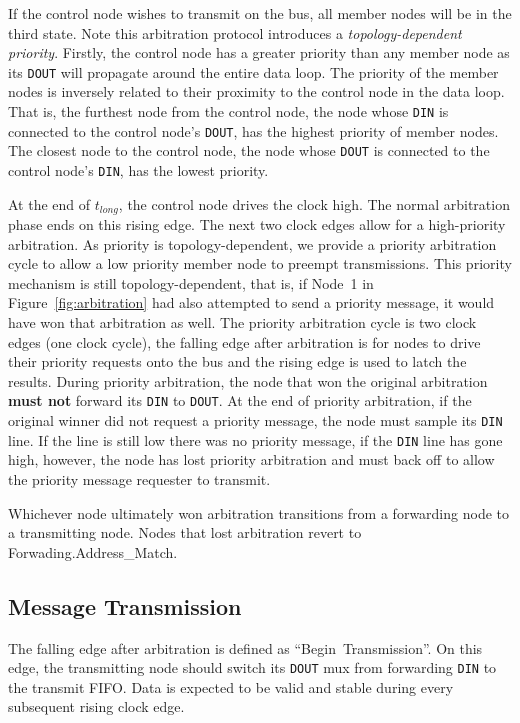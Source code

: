 If the control node wishes to transmit on the bus, all member nodes will be in
the third state. Note this arbitration protocol introduces a {\em
topology-dependent priority}. Firstly, the control node has a greater priority
than any member node as its {\tt DOUT} will propagate around the entire data
loop. The priority of the member nodes is inversely related to their proximity
to the control node in the data loop. That is, the furthest node from the
control node, the node whose {\tt DIN} is connected to the control node's
{\tt DOUT}, has the highest priority of member nodes. The closest node to the
control node, the node whose {\tt DOUT} is connected to the control node's
{\tt DIN}, has the lowest priority.

At the end of $t_{long}$, the control node drives the clock high. The
normal arbitration phase ends on this rising edge. The next two clock edges
allow for a high-priority arbitration. As \bus priority is topology-dependent,
we provide a priority arbitration cycle to allow a low priority member node to
preempt transmissions. This priority mechanism is still topology-dependent,
that is, if Node~1 in Figure~\ref{fig:arbitration} had also attempted to send
a priority message, it would have won that arbitration as well. The priority
arbitration cycle is two clock edges (one clock cycle), the falling edge after
arbitration is for nodes to drive their priority requests onto the bus and the
rising edge is used to latch the results.  During priority arbitration, the
node that won the original arbitration {\bf must not} forward its {\tt DIN} to
{\tt DOUT}. At the end of priority
arbitration, if the original winner did not request a priority message, the
node must sample its {\tt DIN} line. If the line is still low there was no
priority message, if the {\tt DIN} line has gone high, however, the node
has lost priority arbitration and must back off to allow the priority message
requester to transmit.

Whichever node ultimately won arbitration transitions from a forwarding node
to a transmitting node. Nodes that lost arbitration revert to
Forwading.{\sc Address\_Match}.

\begin{figure}
  \figTimingInterrupt
\end{figure}

\subsection{Message Transmission}
\label{sec:protocol-transmission}
The falling edge after arbitration is defined as ``Begin~Transmission''. On this
edge, the transmitting node should switch its {\tt DOUT} mux from forwarding
{\tt DIN} to the transmit FIFO. Data is expected to be valid and stable during
every subsequent rising clock edge.

